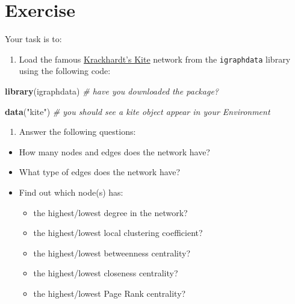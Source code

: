 \documentclass[
]{book}
\newenvironment{Shaded}{\begin{snugshade}}{\end{snugshade}}
\newcommand{\CommentTok}[1]{\textcolor[rgb]{0.56,0.35,0.01}{\textit{#1}}}
\newcommand{\FunctionTok}[1]{\textcolor[rgb]{0.13,0.29,0.53}{\textbf{#1}}}
\newcommand{\NormalTok}[1]{#1}
\newcommand{\StringTok}[1]{\textcolor[rgb]{0.31,0.60,0.02}{#1}}
\providecommand{\tightlist}{%
  \setlength{\itemsep}{0pt}\setlength{\parskip}{0pt}}
\begin{document}
\section{Exercise}\label{exercise-5}

Your task is to:

\begin{enumerate}
\def\labelenumi{\arabic{enumi}.}
\tightlist
\item
  Load the famous \href{https://en.wikipedia.org/wiki/Krackhardt_kite_graph}{Krackhardt's Kite} network from the \texttt{igraphdata} library using the following code:
\end{enumerate}

\begin{Shaded}
\begin{Highlighting}[]
\FunctionTok{library}\NormalTok{(igraphdata) }\CommentTok{\# have you downloaded the package? }

\FunctionTok{data}\NormalTok{(}\StringTok{"kite"}\NormalTok{) }\CommentTok{\# you should see a kite object appear in your Environment}
\end{Highlighting}
\end{Shaded}

\begin{enumerate}
\def\labelenumi{\arabic{enumi}.}
\setcounter{enumi}{1}
\tightlist
\item
  Answer the following questions:
\end{enumerate}

\begin{itemize}
\item
  How many nodes and edges does the network have?
\item
  What type of edges does the network have?
\item
  Find out which node(s) has:

  \begin{itemize}
  \tightlist
  \item
    the highest/lowest degree in the network?
  \item
    the highest/lowest local clustering coefficient?
  \item
    the highest/lowest betweenness centrality?
  \item
    the highest/lowest closeness centrality?
  \item
    the highest/lowest Page Rank centrality?
  \end{itemize}
\end{itemize}
\end{document}
